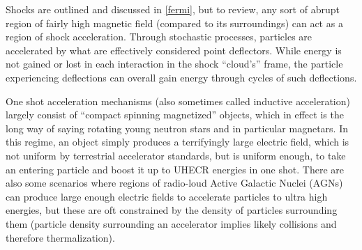 Shocks are outlined and discussed in \autoref{fermi}, but to review, any sort of abrupt region of fairly high magnetic field (compared to its surroundings) can act as a region of shock acceleration. Through stochastic processes, particles are accelerated by what are effectively considered point deflectors. While energy is not gained or lost in each interaction in the shock ``cloud's'' frame, the particle experiencing deflections can overall gain energy through cycles of such deflections.

One shot acceleration mechanisms (also sometimes called inductive acceleration) largely consist of ``compact spinning magnetized'' objects, which in effect is the long way of saying rotating young neutron stars and in particular magnetars. In this regime, an object simply produces a terrifyingly large electric field, which is not uniform by terrestrial accelerator standards, but is uniform enough, to take an entering particle and boost it up to UHECR energies in one shot. There are also some scenarios where regions of radio-loud Active Galactic Nuclei (AGNs) can produce large enough electric fields to accelerate particles to ultra high energies, but these are oft constrained by the density of particles surrounding them (particle density surrounding an accelerator implies likely collisions and therefore thermalization). 

